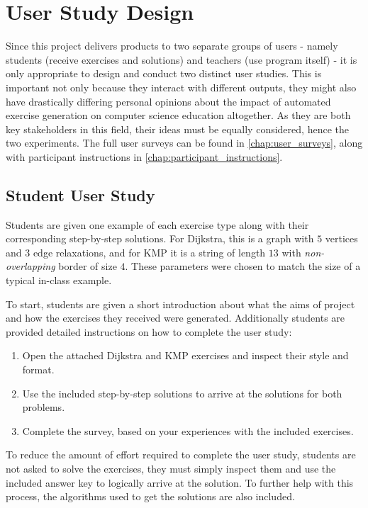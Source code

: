 \documentclass{l4proj}
\begin{document}
\section{User Study Design}
\label{sec:exp_design}

Since this project delivers products to two separate groups of users - namely students (receive exercises and solutions) and teachers (use program itself) - it is only appropriate to design and conduct two distinct user studies. This is important not only because they interact with different outputs, they might also have drastically differing personal opinions about the impact of automated exercise generation on computer science education altogether. As they are both key stakeholders in this field, their ideas must be equally considered, hence the two experiments. The full user surveys can be found in \autoref{chap:user_surveys}, along with participant instructions in \autoref{chap:participant_instructions}.

\subsection{Student User Study}

Students are given one example of each exercise type along with their corresponding step-by-step solutions. For Dijkstra, this is a graph with $5$ vertices and $3$ edge relaxations, and for KMP it is a string of length $13$ with \emph{non-overlapping} border of size $4$. These parameters were chosen to match the size of a typical in-class example. 

To start, students are given a short introduction about what the aims of project and how the exercises they received were generated. Additionally students are provided detailed instructions on how to complete the user study:
\begin{enumerate}
	\item
	Open the attached Dijkstra and KMP exercises and inspect their style and format.
	\item
	Use the included step-by-step solutions to arrive at the solutions for both problems.
	\item
	Complete the survey, based on your experiences with the included exercises.
\end{enumerate}

To reduce the amount of effort required to complete the user study, students are not asked to solve the exercises, they must simply inspect them and use the included answer key to logically arrive at the solution. To further help with this process, the algorithms used to get the solutions are also included.
\end{document}
